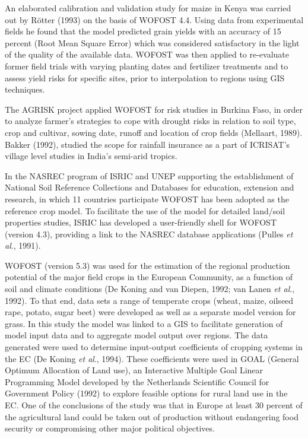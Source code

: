 \bigskip
An elaborated calibration and validation study for maize in Kenya was carried out by
R\"{o}tter (1993) on the basis of WOFOST 4.4. Using data from experimental fields he
found that the model predicted grain yields with an accuracy of 15 percent (Root Mean
Square Error) which was considered satisfactory in the light of the quality of the available
data. WOFOST was then applied to re-evaluate former field trials with varying planting
dates and fertilizer treatments and to assess yield risks for specific sites, prior to
interpolation to regions using GIS techniques.

\bigskip
The AGRISK project applied WOFOST for risk studies in Burkina Faso, in order to
analyze farmer's strategies to cope with drought risks in relation to soil type, crop and
cultivar, sowing date, runoff and location of crop fields (Mellaart, 1989). Bakker (1992),
studied the scope for rainfall insurance as a part of ICRISAT's village level studies in
India's semi-arid tropics.

\bigskip
In the NASREC program of ISRIC and UNEP supporting the estab\-lishment of National
Soil Reference Collections and Databases for education, extension and research, in which
11 countries participate WOFOST has been adopted as the reference crop model. To
facilitate the use of the model for detailed {\nobreak}land/soil properties studies, ISRIC has
developed a user-friendly shell for WOFOST (version 4.3), providing a link to the
NASREC database applications (Pulles {\it et al\/}., 1991).

\bigskip
WOFOST (version 5.3) was used for the estimation of the {\nobreak}regional production potential of
the major field crops in the European Community, as a function of soil and climate condi\-tions (De Koning and van Diepen, 1992; van Lanen {\it et al\/}., 1992). To that end, data sets a
range of temperate crops (wheat, maize, oilseed rape, potato, sugar beet) were devel\-oped
as well as a separate model version for grass. In this study the model was linked to a GIS
to facilitate generation of model input data and to aggregate model output over regions.
The data generated were used to determine input-output coefficients of cropping systems
in the EC (De Koning {\it et al\/}., 1994). These coefficients were used in GOAL (General
Optimum Allocation of Land use), an Interactive Multiple Goal Linear Program\-ming
Model developed by the Netherlands Scien\-tific Council for Government Policy (1992) to
explore feasible options for rural land use in the EC. One of the conclusions of the study
was that in Europe at least 30 percent of the agricultural land could be taken out of
production without endangering food security or compromising other major politi\-cal
objectives.

